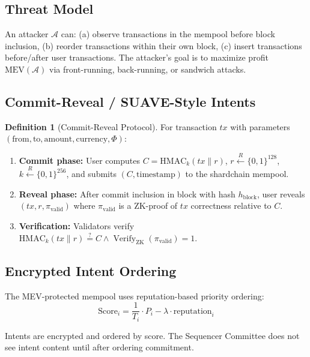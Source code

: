 \documentclass[12pt,a4paper]{article}
\theoremstyle{definition}
\newtheorem{definition}{Definition}[section]
\theoremstyle{remark}
\DeclareMathOperator{\Verify}{Verify}
\begin{document}
\subsection{Threat Model}

An attacker $\mathcal{A}$ can: (a) observe transactions in the mempool before block inclusion, (b) reorder transactions within their own block, (c) insert transactions before/after user transactions. The attacker's goal is to maximize profit $\text{MEV}(\mathcal{A})$ via front-running, back-running, or sandwich attacks.

\subsection{Commit-Reveal / SUAVE-Style Intents}

\begin{definition}[Commit-Reveal Protocol]
For transaction $tx$ with parameters $(\text{from}, \text{to}, \text{amount}, \text{currency}, \Phi)$:
\begin{enumerate}[nosep]
    \item \textbf{Commit phase:} User computes $C = \text{HMAC}_k(tx \| r)$, $r \stackrel{R}{\gets} \{0,1\}^{128}$, $k \stackrel{R}{\gets} \{0,1\}^{256}$, and submits $(C, \text{timestamp})$ to the shardchain mempool.
    \item \textbf{Reveal phase:} After commit inclusion in block with hash $h_{\text{block}}$, user reveals $(tx, r, \pi_{\text{valid}})$ where $\pi_{\text{valid}}$ is a ZK-proof of $tx$ correctness relative to $C$.
    \item \textbf{Verification:} Validators verify $\text{HMAC}_k(tx \| r) \stackrel{?}{=} C \wedge \Verify_{\text{ZK}}(\pi_{\text{valid}}) = 1$.
\end{enumerate}
\end{definition}

\subsection{Encrypted Intent Ordering}

The MEV-protected mempool uses reputation-based priority ordering:
\begin{equation}
\text{Score}_i = \frac{1}{T_i} \cdot P_i - \lambda \cdot \text{reputation}_i
\end{equation}

Intents are encrypted and ordered by score. The Sequencer Committee does not see intent content until after ordering commitment.
\end{document}
